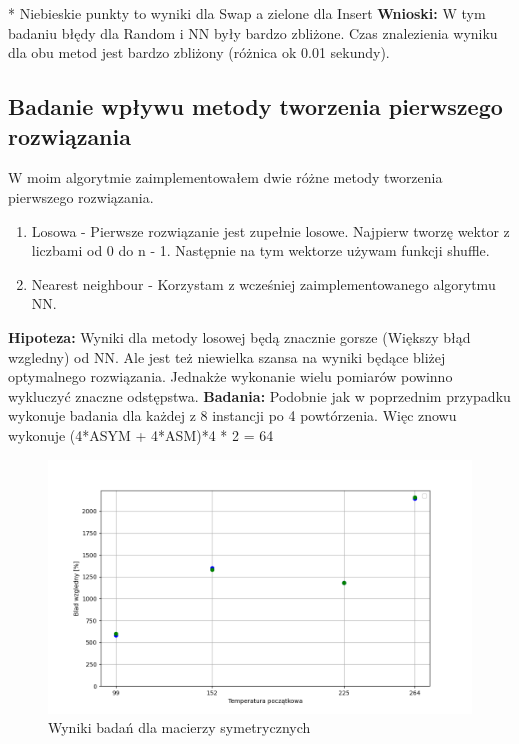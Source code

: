\documentclass{article}
\begin{document}
        \FloatBarrier
        * Niebieskie punkty to wyniki dla Swap a zielone dla Insert \linebreak
        \textbf{Wnioski: } W tym badaniu błędy dla Random i NN były bardzo zbliżone. Czas znalezienia 
        wyniku dla obu metod jest bardzo zbliżony (różnica ok 0.01 sekundy).
      \subsection{Badanie wpływu metody tworzenia pierwszego rozwiązania}
        W moim algorytmie zaimplementowałem dwie różne metody tworzenia pierwszego rozwiązania.
        \begin{enumerate}
          \item Losowa - Pierwsze rozwiązanie jest zupełnie losowe. Najpierw tworzę wektor z liczbami
          od 0 do n - 1. Następnie na tym wektorze używam funkcji shuffle. 
          \item Nearest neighbour - Korzystam z wcześniej zaimplementowanego algorytmu NN. 
        \end{enumerate}
        \textbf{Hipoteza: } Wyniki dla metody losowej będą znacznie gorsze (Większy błąd wzgledny) od NN.
        Ale jest też niewielka szansa na wyniki będące bliżej optymalnego rozwiązania. Jednakże wykonanie
        wielu pomiarów powinno wykluczyć znaczne odstępstwa.\linebreak
        \textbf{Badania: } Podobnie jak w poprzednim przypadku wykonuje badania dla każdej z 8 instancji
        po 4 powtórzenia. Więc znowu wykonuje (4*ASYM + 4*ASM)*4 * 2 = 64\linebreak
        \FloatBarrier
        
        \FloatBarrier
        \begin{figure}[ht]
          \centering
          \includegraphics[width=\textwidth]{src/plots/symAnStartVal.png}
          \caption{Wyniki badań dla macierzy symetrycznych}
          \label{fig:symAnStartVal}
        \end{figure}
\end{document}
